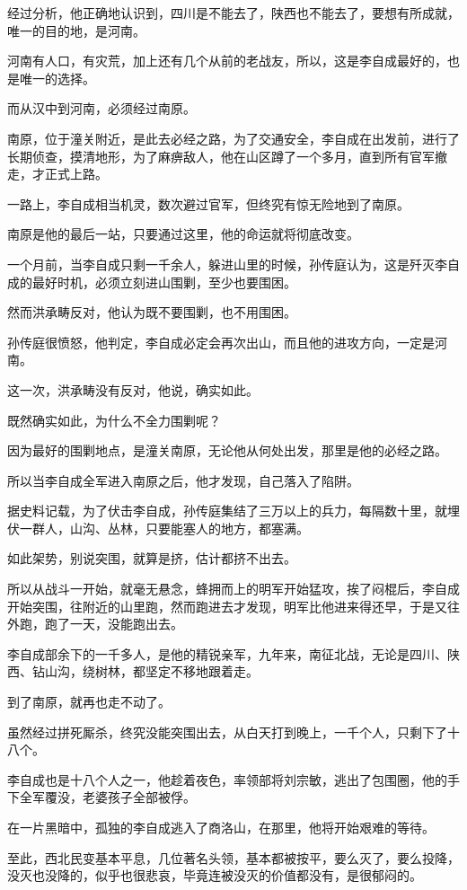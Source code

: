 \begin{multicols}{\theparacolNo}
经过分析，他正确地认识到，四川是不能去了，陕西也不能去了，要想有所成就，唯一的目的地，是河南。

河南有人口，有灾荒，加上还有几个从前的老战友，所以，这是李自成最好的，也是唯一的选择。

而从汉中到河南，必须经过南原。

南原，位于潼关附近，是此去必经之路，为了交通安全，李自成在出发前，进行了长期侦查，摸清地形，为了麻痹敌人，他在山区蹲了一个多月，直到所有官军撤走，才正式上路。

一路上，李自成相当机灵，数次避过官军，但终究有惊无险地到了南原。

南原是他的最后一站，只要通过这里，他的命运就将彻底改变。

一个月前，当李自成只剩一千余人，躲进山里的时候，孙传庭认为，这是歼灭李自成的最好时机，必须立刻进山围剿，至少也要围困。

然而洪承畴反对，他认为既不要围剿，也不用围困。

孙传庭很愤怒，他判定，李自成必定会再次出山，而且他的进攻方向，一定是河南。

这一次，洪承畴没有反对，他说，确实如此。

既然确实如此，为什么不全力围剿呢？

因为最好的围剿地点，是潼关南原，无论他从何处出发，那里是他的必经之路。

所以当李自成全军进入南原之后，他才发现，自己落入了陷阱。

据史料记载，为了伏击李自成，孙传庭集结了三万以上的兵力，每隔数十里，就埋伏一群人，山沟、丛林，只要能塞人的地方，都塞满。

如此架势，别说突围，就算是挤，估计都挤不出去。

所以从战斗一开始，就毫无悬念，蜂拥而上的明军开始猛攻，挨了闷棍后，李自成开始突围，往附近的山里跑，然而跑进去才发现，明军比他进来得还早，于是又往外跑，跑了一天，没能跑出去。

李自成部余下的一千多人，是他的精锐亲军，九年来，南征北战，无论是四川、陕西、钻山沟，绕树林，都坚定不移地跟着走。

到了南原，就再也走不动了。

虽然经过拼死厮杀，终究没能突围出去，从白天打到晚上，一千个人，只剩下了十八个。

李自成也是十八个人之一，他趁着夜色，率领部将刘宗敏，逃出了包围圈，他的手下全军覆没，老婆孩子全部被俘。

在一片黑暗中，孤独的李自成逃入了商洛山，在那里，他将开始艰难的等待。

至此，西北民变基本平息，几位著名头领，基本都被按平，要么灭了，要么投降，没灭也没降的，似乎也很悲哀，毕竟连被没灭的价值都没有，是很郁闷的。


\end{multicols}
